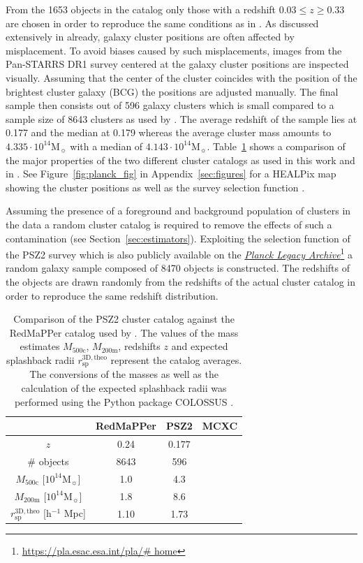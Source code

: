 \documentclass[a4paper,fleqn,usenatbib]{mnras}
\newcommand\fnurl[2]{%
  \href{#2}{#1}\footnote{\url{#2}}%
}
\begin{document}
From the 1653 objects in the catalog only those with a redshift $0.03 \leq z \geq 0.33$ are chosen in order to reproduce the same conditions as in \citet{more2016detection}. As discussed extensively in \citet{more2016detection} already, galaxy cluster positions are often affected by misplacement. To avoid biases caused by such misplacements, images from the Pan-STARRS DR1 survey centered at the galaxy cluster positions are inspected visually. Assuming that the center of the cluster coincides with the position of the brightest cluster galaxy (BCG) the positions are adjusted manually. The final sample then consists out of 596 galaxy clusters which is small compared to a sample size of 8643 clusters as used by \citet{more2016detection}. The average redshift of the sample lies at 0.177 and the median at 0.179 whereas the average cluster mass amounts to $4.335 \cdot 10^{14} $M$_{\sun}$ with a median of $4.143 \cdot 10^{14} $M$_{\sun}$. Table~\ref{tab:cluster_catalogs} shows a comparison of the major properties of the two different cluster catalogs as used in this work and in \citet{more2016detection}. See Figure~\ref{fig:planck_fig} in Appendix~\ref{sec:figures} for a HEALPix map showing the cluster positions as well as the survey selection function \citep{2005ApJ...622..759G}.

Assuming the presence of a foreground and background population of clusters in the data a random cluster catalog is required to remove the effects of such a contamination (see Section~\ref{sec:estimators}). Exploiting the selection function of the PSZ2 survey which is also publicly available on the \fnurl{\textit{Planck Legacy Archive}}{https://pla.esac.esa.int/pla/\# home} a random galaxy sample composed of 8470 objects is constructed. The redshifts of the objects are drawn randomly from the redshifts of the actual cluster catalog in order to reproduce the same redshift distribution.


\begin{table}
    \centering
    \caption{Comparison of the PSZ2 cluster catalog against the RedMaPPer catalog used by \citet{more2016detection}. The values of the mass estimates $M_{\mathrm{500c}}$, $M_{\mathrm{200m}}$, redshifts $z$ and expected splashback radii $r^{\mathrm{3D,theo}}_{\mathrm{sp}}$ represent the catalog averages. The conversions of the masses as well as the calculation of the expected splashback radii was performed using the Python package COLOSSUS \citep{diemer2017colossus}.}
    \label{tab:cluster_catalogs} 
    \begin{tabular}{|c|c|c|c|}
    \hline 
    & RedMaPPer & PSZ2 & MCXC \\ 
    \hline 
    $z$ & 0.24 & 0.177 & \\ 
    \hline 
    \# objects & 8643 & 596 & \\ 
    \hline
    $M_{\mathrm{500c}}$ [$10^{14} $M$_{\sun}$] & 1.0 & 4.3 & \\ 
    \hline
    $M_{\mathrm{200m}}$ [$10^{14} $M$_{\sun}$] & 1.8 & 8.6 & \\ 
    \hline
    $r^{\mathrm{3D,theo}}_{\mathrm{sp}}$ [h$^{-1}$ Mpc] & 1.10 & 1.73 & \\ 
    \hline
    \end{tabular} 
\end{table}
\end{document}
